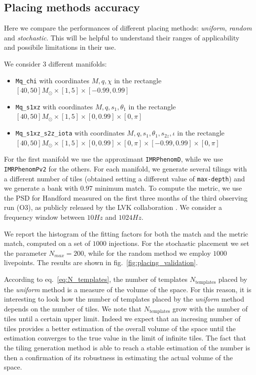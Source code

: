 \documentclass[twocolumn,showpacs,preprintnumbers,nofootinbib,prd,
superscriptaddress,10pt]{revtex4-2}
\begin{document}
\subsection{Placing methods accuracy} \label{sec:placing_accuracy}

Here we compare the performances of different placing methods: \textit{uniform}, \textit{random} and \textit{stochastic}.
This will be helpful to understand their ranges of applicability and possibile limitations in their use.

We consider 3 different manifolds:
\begin{itemize}
	\item \texttt{Mq\_chi} with coordinates $M, q, \chi $ in the rectangle $[40, 50] M_\odot \times [1,5] \times [-0.99, 0.99]$
	\item \texttt{Mq\_s1xz} with coordinates $M, q, s_{1}, \theta_1$ in the rectangle $[40, 50] M_\odot \times [1,5] \times [0, 0.99] \times [0,\pi]$
	\item \texttt{Mq\_s1xz\_s2z\_iota} with coordinates $M, q, s_{1}, \theta_1, s_{2z}, \iota$ in the rectangle $[40, 50] M_\odot \times [1,5] \times [0, 0.99] \times [0,\pi] \times [-0.99, 0.99] \times [0, \pi]$
\end{itemize}
For the first manifold we use the approximant \texttt{IMRPhenomD}, while we use \texttt{IMRPhenomPv2} for the others.
For each manifold, we generate several tilings with a different number of tiles (obtained setting a different value of \texttt{max-depth}) and we generate a bank with $0.97$ minimum match.
To compute the metric, we use the PSD for Handford measured on the first three months of the third observing run (O3), as publicly released by the LVK collaboration \cite{O3a_PSDs}.
We consider a frequency window between $10Hz$ and $1024Hz$.

We report the histogram of the fitting factors for both the match and the metric match, computed on a set of $1000$ injections.
For the stochastic placement we set the parameter $N_{max} = 200$, while for the random method we employ $1000$ livepoints.
The results are shown in fig.~\ref{fig:placing_validation}.

According to eq.~\eqref{eq:N_templates}, the number of templates $N_{\text{templates}}$ placed by the {\it uniform} method is a measure of the volume of the space. For this reason, it is interesting to look how the number of templates placed by the {\it uniform} method depends on the number of tiles.
We note that $N_{\text{templates}}$ grow with the number of tiles until a certain upper limit. Indeed we expect that an incresing number of tiles provides a better estimation of the overall volume of the space until the estimation converges to the true value in the limit of infinite tiles. 
The fact that the tiling generation method is able to reach a stable estimation of the number is then a confirmation of its robustness in estimating the actual volume of the space.
\end{document}
